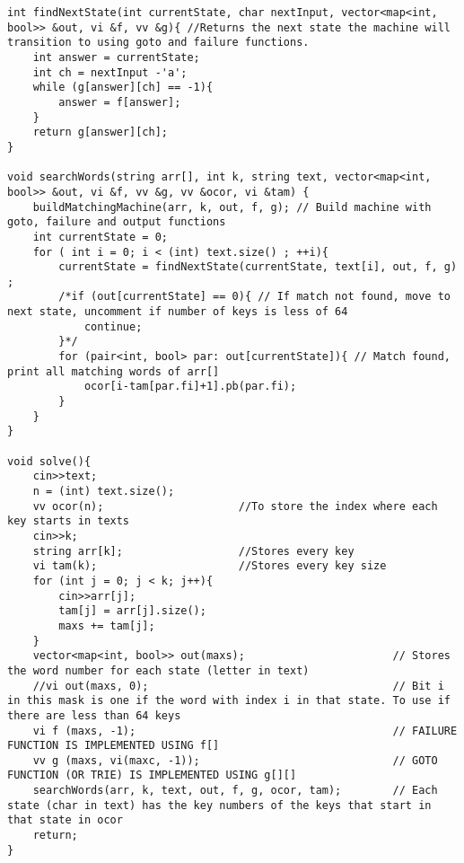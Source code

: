 \documentclass{article}
\begin{document}
\begin{multicols}{2}
\begin{lstlisting}
int findNextState(int currentState, char nextInput, vector<map<int, bool>> &out, vi &f, vv &g){ //Returns the next state the machine will transition to using goto and failure functions.
	int answer = currentState;
	int ch = nextInput -'a';
	while (g[answer][ch] == -1){
		answer = f[answer];
	}
	return g[answer][ch];
}

void searchWords(string arr[], int k, string text, vector<map<int, bool>> &out, vi &f, vv &g, vv &ocor, vi &tam) {
	buildMatchingMachine(arr, k, out, f, g); // Build machine with goto, failure and output functions
	int currentState = 0;
	for ( int i = 0; i < (int) text.size() ; ++i){
		currentState = findNextState(currentState, text[i], out, f, g) ;
		/*if (out[currentState] == 0){ // If match not found, move to next state, uncomment if number of keys is less of 64
			continue;
		}*/
		for (pair<int, bool> par: out[currentState]){ // Match found, print all matching words of arr[]
			ocor[i-tam[par.fi]+1].pb(par.fi);
		}
	}
}

void solve(){
	cin>>text;
	n = (int) text.size();
	vv ocor(n);                     //To store the index where each key starts in texts
	cin>>k;
	string arr[k];                  //Stores every key
	vi tam(k);                      //Stores every key size
	for (int j = 0; j < k; j++){
		cin>>arr[j];
		tam[j] = arr[j].size();
		maxs += tam[j];
	}
	vector<map<int, bool>> out(maxs);                       // Stores the word number for each state (letter in text)
	//vi out(maxs, 0);                                      // Bit i in this mask is one if the word with index i in that state. To use if there are less than 64 keys
	vi f (maxs, -1);                                        // FAILURE FUNCTION IS IMPLEMENTED USING f[]
	vv g (maxs, vi(maxc, -1));                              // GOTO FUNCTION (OR TRIE) IS IMPLEMENTED USING g[][]
	searchWords(arr, k, text, out, f, g, ocor, tam);        // Each state (char in text) has the key numbers of the keys that start in that state in ocor  
	return;
}	
\end{lstlisting}


\end{multicols}
\end{document}
